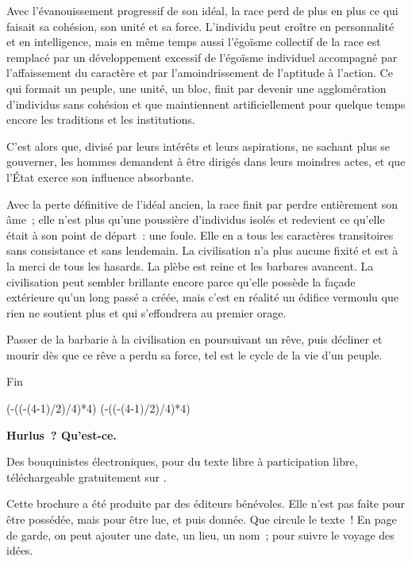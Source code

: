 \documentclass[french,twoside]{book} %
\def\truncdiv#1#2{((#1-(#2-1)/2)/#2)}
\def\moduloop#1#2{(#1-\truncdiv{#1}{#2}*#2)}
\def\modulo#1#2{\number\numexpr\moduloop{#1}{#2}\relax}
\begin{document}
Avec l’évanouissement progressif de son idéal, la race perd de plus en plus ce qui faisait sa cohésion, son unité et sa force. L’individu peut croître en personnalité et en intelligence, mais en même temps aussi l’égoïsme collectif de la race est remplacé par un développement excessif de l’égoïsme individuel accompagné par l’affaissement du caractère et par l’amoindrissement de l’aptitude à l’action. Ce qui formait un peuple, une unité, un bloc, finit par devenir une agglomération d’individus sans cohésion et que maintiennent artificiellement pour quelque temps encore les traditions et les institutions.\par
C’est alors que, divisé par leurs intérêts et leurs aspirations, ne sachant plus se gouverner, les hommes demandent à être dirigés dans leurs moindres actes, et que l’État exerce son influence absorbante.\par
Avec la perte définitive de l’idéal ancien, la race finit par perdre entièrement son âme ; elle n’est plus qu’une poussière d’individus isolés et redevient ce qu’elle était à son point de départ : une foule. Elle en a tous les caractères transitoires sans consis­tance et sans lendemain. La civilisation n’a plus aucune fixité et est à la merci de tous les hasards. La plèbe est reine et les barbares avancent. La civilisation peut sembler brillante encore parce qu’elle possède la façade extérieure qu’un long passé a créée, mais c’est en réalité un édifice vermoulu que rien ne soutient plus et qui s’effondrera au premier orage.\par
Passer de la barbarie à la civilisation en poursuivant un rêve, puis décliner et mourir dès que ce rêve a perdu sa force, tel est le cycle de la vie d’un peuple.\par
Fin
 


\ifbooklet
  \pagestyle{empty}
  \clearpage
  \ifnum\modulo{\value{page}}{4}=0 \hbox{}\newpage\hbox{}\newpage\fi
  \ifnum\modulo{\value{page}}{4}=1 \hbox{}\newpage\hbox{}\newpage\fi


  \hbox{}\newpage
  \ifodd\value{page}\hbox{}\newpage\fi
  {\centering\color{rubric}\bfseries\noindent\large
    Hurlus ? Qu’est-ce.\par
    \bigskip
  }
  \noindent Des bouquinistes électroniques, pour du texte libre à participation libre,
  téléchargeable gratuitement sur \href{https://hurlus.fr}{}.\par
  \bigskip
  \noindent Cette brochure a été produite par des éditeurs bénévoles.
  Elle n’est pas faîte pour être possédée, mais pour être lue, et puis donnée.
  Que circule le texte !
  En page de garde, on peut ajouter une date, un lieu, un nom ; pour suivre le voyage des idées.
  \par
\end{document}
